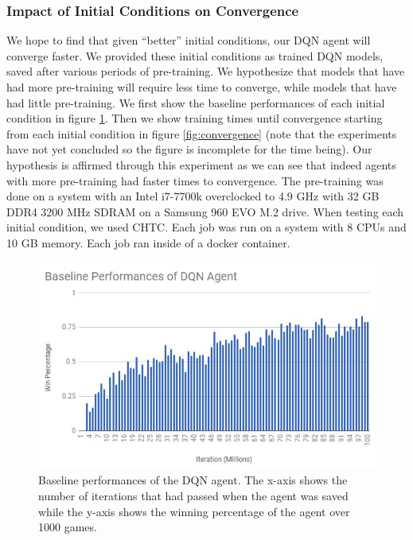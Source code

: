 \documentclass[twocolumn]{article}
\begin{document}
	\subsubsection*{Impact of Initial Conditions on Convergence}
	We hope to find that given ``better'' initial conditions, our DQN agent 
	will converge faster. We provided these initial conditions as trained DQN 
	models, saved after various periods of pre-training. We hypothesize that 
	models that have had more pre-training will require less time to converge, 
	while models that have had little pre-training. We first show the baseline 
	performances of each initial condition in figure \ref{fig:baseline}. Then 
	we show training times until convergence starting from each initial 
	condition in figure \ref{fig:convergence} (note that the experiments have 
	not yet concluded so the figure is incomplete for the time being). Our 
	hypothesis is affirmed 	through this experiment as we can see that indeed 
	agents with more pre-training had faster times to convergence. The 
	pre-training was done on a system with an Intel i7-7700k overclocked to 4.9 
	GHz with 32 GB DDR4 3200 MHz SDRAM on a Samsung 960 EVO M.2 drive. When 
	testing each initial condition, we used CHTC. Each job was run on a system 
	with 8 CPUs and 10 GB memory. Each job ran inside of a docker container.\\
	\begin{figure}[htb]
		\centering
		\includegraphics[width=\linewidth]{baseline.jpg}
		\caption{Baseline performances of the DQN agent. The x-axis shows the number of iterations that had passed when the agent was saved while the y-axis shows the winning percentage of the agent over 1000 games.}
		\label{fig:baseline}
	\end{figure}\\
\end{document}
